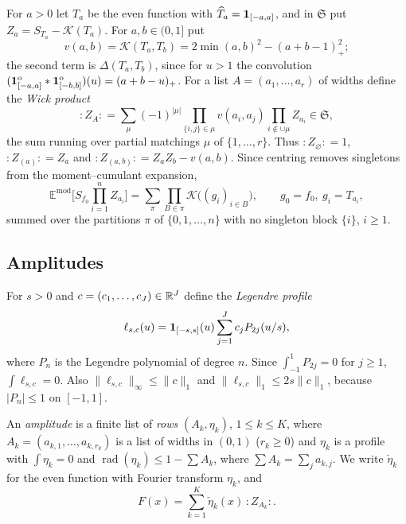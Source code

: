 \documentclass[11pt,colorlinks]{charlie}
\newcommand{\rad}{\operatorname{rad}}
\newcommand{\Ka}{\mathcal{K}}
\newcommand{\ho}[1]{#1^{\mathrm{o}}}
\newcommand{\Wk}[1]{{:}#1{:}}
\begin{document}
For $a>0$ let $T_a$ be the even function with $\widehat T_a=\mathbf{1}_{[-a,a]}$, and in $\mathfrak S$ put $Z_a=S_{T_a}-\Ka(T_a)$. For $a,b\in(0,1]$ put
\begin{equation}\label{eq:vab}
 v(a,b)=\Ka(T_a,T_b)=2\min(a,b)^2-(a+b-1)_+^2 ;
\end{equation}
the second term is $\Delta(T_a,T_b)$, since for $u>1$ the convolution $(\ho{\one_{[-a,a]}}*\ho{\one_{[-b,b]}})(u)=(a+b-u)_+$. For a list $A=(a_1,\dots,a_r)$ of widths define the \emph{Wick product}
\[
 \Wk{Z_A}=\sum_{\mu}(-1)^{|\mu|}\prod_{\{i,j\}\in\mu}v(a_i,a_j)\prod_{i\notin\cup\mu}Z_{a_i}\in\mathfrak S,
\]
the sum running over partial matchings $\mu$ of $\{1,\dots,r\}$. Thus $\Wk{Z_\varnothing}=1$, $\Wk{Z_{(a)}}=Z_a$ and $\Wk{Z_{(a,b)}}=Z_aZ_b-v(a,b)$. Since centring removes singletons from the moment--cumulant expansion,
\begin{equation}\label{eq:centred}
 \mathbb E^{\mathrm{mod}}\Big[S_{f_0}\prod_{i=1}^nZ_{a_i}\Big]=\sum_\pi\prod_{B\in\pi}\Ka\big((g_i)_{i\in B}\big),\qquad g_0=f_0,\ g_i=T_{a_i},
\end{equation}
summed over the partitions $\pi$ of $\{0,1,\dots,n\}$ with no singleton block $\{i\}$, $i\ge1$.

\subsection{Amplitudes}
For $s>0$ and $c=(c_1,\dots,c_J)\in\mathbb{R}^J$ define the \emph{Legendre profile}
\[
 \ell_{s,c}(u)=\mathbf{1}_{[-s,s]}(u)\sum_{j=1}^Jc_jP_{2j}(u/s),
\]
where $P_n$ is the Legendre polynomial of degree $n$. Since $\int_{-1}^1P_{2j}=0$ for $j\ge1$, $\int\ell_{s,c}=0$. Also $\|\ell_{s,c}\|_\infty\le\|c\|_1$ and $\|\ell_{s,c}\|_1\le2s\|c\|_1$, because $|P_n|\le1$ on $[-1,1]$.

\begin{definition}\label{def:amplitude}
An \emph{amplitude} is a finite list of \emph{rows} $(A_k,\eta_k)$, $1\le k\le K$, where $A_k=(a_{k,1},\dots,a_{k,r_k})$ is a list of widths in $(0,1)$ ($r_k\ge0$) and $\eta_k$ is a profile with $\int\eta_k=0$ and $\rad(\eta_k)\le1-\sum A_k$, where $\sum A_k=\sum_ja_{k,j}$. We write $\check\eta_k$ for the even function with Fourier transform $\eta_k$, and
\[
 F(x)=\sum_{k=1}^K\check\eta_k(x)\,\Wk{Z_{A_k}} .
\]
\end{definition}
\end{document}
